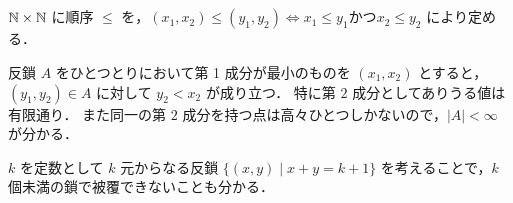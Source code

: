 \subsection{}
$\mathbb{N}\times \mathbb{N}$ に順序 $\leq$ を，$(x_1,x_2)\leq (y_1,y_2)\iff x_1\leq y_1 \text{かつ} x_2\leq y_2$ により定める．

反鎖 $A$ をひとつとりにおいて第 1 成分が最小のものを $(x_1,x_2)$ とすると，$(y_1,y_2)\in A$ に対して $y_2 < x_2$ が成り立つ．
特に第 $2$ 成分としてありうる値は有限通り．
また同一の第 $2$ 成分を持つ点は高々ひとつしかないので，$|A| < \infty$ が分かる．

$k$ を定数として $k$ 元からなる反鎖 $\{(x,y)\mid x+y=k+1\}$ を考えることで，$k$ 個未満の鎖で被覆できないことも分かる．
